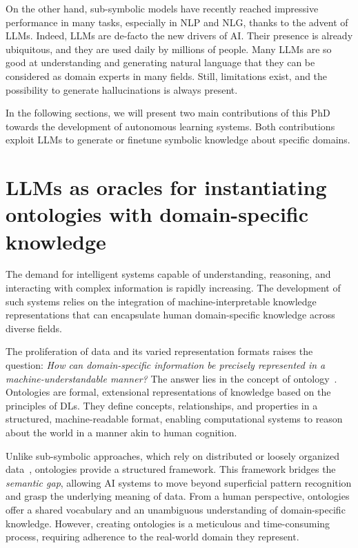 On the other hand, sub-symbolic models have recently reached impressive performance in many tasks, especially in \gls{NLP} and \gls{NLG}, thanks to the advent of \glspl{LLM}.
%
Indeed, \glspl{LLM} are de-facto the new drivers of \gls{AI}.
%
Their presence is already ubiquitous, and they are used daily by millions of people.
%
Many \glspl{LLM} are so good at understanding and generating natural language that they can be considered as domain experts in many fields.
%
Still, limitations exist, and the possibility to generate hallucinations is always present.


In the following sections, we will present two main contributions of this PhD towards the development of autonomous learning systems.
%
Both contributions exploit \glspl{LLM} to generate or finetune symbolic knowledge about specific domains.



\section{\Glspl{LLM} as oracles for instantiating ontologies with domain-specific knowledge}
\label{sec:llm-as-oracles-for-instantiating-ontologies-with-domain-specific-knowledge}
%
The demand for intelligent systems capable of understanding, reasoning, and interacting with complex information is rapidly increasing.
%
The development of such systems relies on the integration of machine-interpretable knowledge representations that can encapsulate human domain-specific knowledge across diverse fields.


The proliferation of data and its varied representation formats raises the question: \emph{How can domain-specific information be precisely represented in a machine-understandable manner?}
%
The answer lies in the concept of ontology~\cite{placeholder}.
%
Ontologies are formal, extensional representations of knowledge based on the principles of \glspl{DL}.
%
They define concepts, relationships, and properties in a structured, machine-readable format, enabling computational systems to reason about the world in a manner akin to human cognition.


Unlike sub-symbolic approaches, which rely on distributed or loosely organized data~\cite{placeholder}, ontologies provide a structured framework.
%
This framework bridges the \emph{semantic gap}, allowing \gls{AI} systems to move beyond superficial pattern recognition and grasp the underlying meaning of data.
%
From a human perspective, ontologies offer a shared vocabulary and an unambiguous understanding of domain-specific knowledge.
%
However, creating ontologies is a meticulous and time-consuming process, requiring adherence to the real-world domain they represent.



